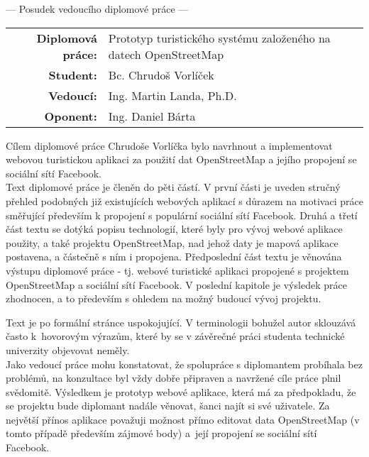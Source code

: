 \documentclass[czech,11pt,a4paper]{article}
\begin{document}
\begin{center}
  {\Large --- Posudek vedoucího diplomové práce ---}
\end{center}

\vspace{.5cm}

\noindent \begin{tabular}{rp{}}
  {\bf Diplomová práce:} & Prototyp turistického systému založeného na datech OpenStreetMap \\
  {\bf Student:} & Bc. Chrudoš Vorlíček \\
  {\bf Vedoucí:} & Ing. Martin Landa, Ph.D. \\
  {\bf Oponent:} & Ing. Daniel Bárta \\
\end{tabular}

\vspace{1cm}

Cílem diplomové práce Chrudoše Vorlíčka bylo navrhnout a implementovat
webovou turistickou aplikaci za použití dat OpenStreetMap a jejího
propojení se sociální sítí Facebook.  \\

Text diplomové práce je členěn do pěti částí. V první části je uveden
stručný přehled podobných již existujících webových aplikací s důrazem
na motivaci práce směřující především k propojení s populární sociální
sítí Facebook. Druhá a třetí část textu se dotýká popisu technologií,
které byly pro vývoj webové aplikace použity, a také projektu
OpenStreetMap, nad jehož daty je mapová aplikace postavena, a částečně
s ním i propojena. Předposlední část textu je věnována výstupu
diplomové práce - tj. webové turistické aplikaci propojené s projektem
OpenStreetMap a sociální sítí Facebook. V poslední kapitole je
výsledek práce zhodnocen, a to především s ohledem na možný budoucí
vývoj projektu.

Text je po formální stránce uspokojující. V terminologii bohužel autor
sklouzává často k~hovorovým výrazům, které by se v závěrečné práci
studenta technické univerzity objevovat neměly.
\\

Jako vedoucí práce mohu konstatovat, že spolupráce s diplomantem
probíhala bez problémů, na konzultace byl vždy dobře připraven a
navržené cíle práce plnil svědomitě. Výsledkem je prototyp webové
aplikace, která má za předpokladu, že se projektu bude diplomant
nadále věnovat, šanci najít si své uživatele. Za největší přínos
aplikace považuji možnost přímo editovat data OpenStreetMap (v tomto
případě především zájmové body) a~její propojení se sociální sítí
Facebook.  \\
\end{document}
